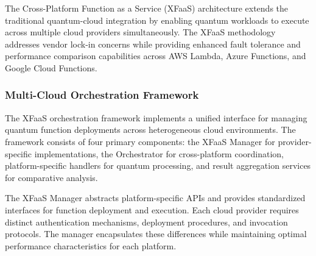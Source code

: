\documentclass[onecolumn]{IEEEtran}
\begin{document}
The Cross-Platform Function as a Service (XFaaS) architecture extends the traditional quantum-cloud integration by enabling quantum workloads to execute across multiple cloud providers simultaneously. The XFaaS methodology addresses vendor lock-in concerns while providing enhanced fault tolerance and performance comparison capabilities across AWS Lambda, Azure Functions, and Google Cloud Functions.

\subsubsection{Multi-Cloud Orchestration Framework}

The XFaaS orchestration framework implements a unified interface for managing quantum function deployments across heterogeneous cloud environments. The framework consists of four primary components: the XFaaS Manager for provider-specific implementations, the Orchestrator for cross-platform coordination, platform-specific handlers for quantum processing, and result aggregation services for comparative analysis.

The XFaaS Manager abstracts platform-specific APIs and provides standardized interfaces for function deployment and execution. Each cloud provider requires distinct authentication mechanisms, deployment procedures, and invocation protocols. The manager encapsulates these differences while maintaining optimal performance characteristics for each platform.
\end{document}
